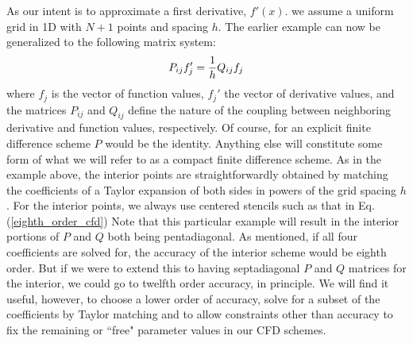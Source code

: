
As our intent is to approximate a first derivative, $f'(x)$.  we assume a uniform grid in 1D with $N+1$ points and spacing $h$.  The earlier example can now be generalized to the following matrix system:
\begin{equation}
P_{ij} f_j' = {1 \over h} Q_{ij} f_j
\end{equation}
where $f_j$ is the vector of function values, $f_j'$ the vector of derivative values, and the matrices $P_{ij}$ and $Q_{ij}$ define the nature of the coupling between neighboring derivative and function values, respectively.  Of course, for an explicit finite difference scheme $P$ would be the identity.  Anything else will constitute some form of what we will refer to as a compact finite difference scheme.  
As in the example above, the interior points 
are straightforwardly obtained by matching the coefficients of a Taylor expansion of both sides in powers of the grid spacing $h$.  For the interior points, we always use centered stencils such as that in Eq.(\ref{eighth_order_cfd})
Note that this particular example will result in the interior portions of $P$ and $Q$ both being pentadiagonal.  As mentioned, if all four coefficients are solved for, the accuracy of the interior scheme would be eighth order.  But if we were to extend this to having septadiagonal $P$ and $Q$ matrices for the interior, we could go to twelfth order accuracy, in principle.  We will find it useful, however, to choose a lower order of accuracy, solve for a subset of the  coefficients by Taylor matching and to allow constraints other than accuracy to fix the remaining or ``free" parameter values in our CFD schemes.    

